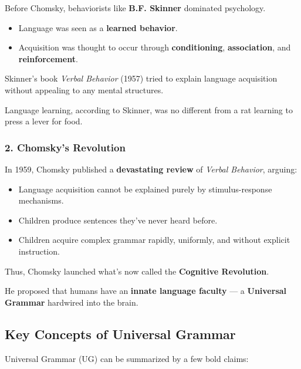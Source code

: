 \documentclass[12pt]{article}
\newcommand{\tightlist}{\itemsep 0pt\parskip 0pt\parsep 0pt}
\begin{document}
Before Chomsky, behaviorists like \textbf{B.F. Skinner} dominated
psychology.

\begin{itemize}
\tightlist
\item
  Language was seen as a \textbf{learned behavior}.
\item
  Acquisition was thought to occur through \textbf{conditioning},
  \textbf{association}, and \textbf{reinforcement}.
\end{itemize}

Skinner's book \emph{Verbal Behavior} (1957) tried to explain language
acquisition without appealing to any mental structures.

Language learning, according to Skinner, was no different from a rat
learning to press a lever for food.

\hypertarget{chomskys-revolution}{%
\subsubsection{2. Chomsky's Revolution}\label{chomskys-revolution}}

In 1959, Chomsky published a \textbf{devastating review} of \emph{Verbal
Behavior}, arguing:

\begin{itemize}
\tightlist
\item
  Language acquisition cannot be explained purely by stimulus-response
  mechanisms.
\item
  Children produce sentences they've never heard before.
\item
  Children acquire complex grammar rapidly, uniformly, and without
  explicit instruction.
\end{itemize}

Thus, Chomsky launched what's now called the \textbf{Cognitive
Revolution}.

He proposed that humans have an \textbf{innate language faculty} --- a
\textbf{Universal Grammar} hardwired into the brain.

\hypertarget{key-concepts-of-universal-grammar}{%
\subsection{Key Concepts of Universal
Grammar}\label{key-concepts-of-universal-grammar}}

Universal Grammar (UG) can be summarized by a few bold claims:
\end{document}
